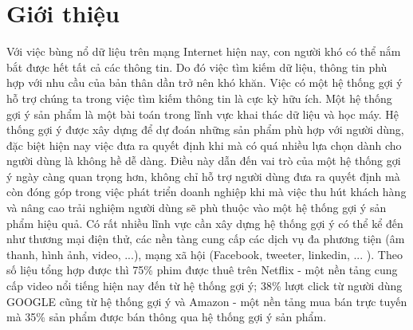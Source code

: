 \chapter{Giới thiệu}
\label{Chapter1}






Với việc bùng nổ dữ liệu trên mạng Internet hiện nay, con người khó có thể nắm bắt được hết tất cả các thông tin.
Do đó việc tìm kiếm dữ liệu, thông tin phù hợp với nhu cầu của bản thân dần trở nên khó khăn.
Việc có một hệ thống gợi ý hỗ trợ chúng ta trong việc tìm kiếm thông tin là cực kỳ hữu ích. 
Một hệ thống gợi ý sản phẩm là một bài toán trong lĩnh vực khai thác dữ liệu và học máy. 
Hệ thống gợi ý được xây dựng để dự đoán những sản phẩm phù hợp với người dùng, đặc biệt hiện nay việc đưa ra quyết định khi mà có quá nhiều lựa chọn dành cho người dùng là không hề dễ dàng. 
Điều này dẫn đến vai trò của một hệ thống gợi ý ngày càng quan trọng hơn, không chỉ hỗ trợ người dùng đưa ra quyết định mà còn đóng góp trong việc phát triển doanh nghiệp khi mà việc thu hút khách hàng và nâng cao trải nghiệm người dùng sẽ phù thuộc vào một hệ thống gợi ý sản phẩm hiệu quả. 
Có rất nhiều lĩnh vực cần xây dựng hệ thống gợi ý có thể kể đến như thương mại điện thử, các nền tàng cung cấp các dịch vụ đa phương tiện (âm thanh, hình ảnh, video, ...), mạng xã hội (Facebook, tweeter, linkedin, ... ).  
Theo số liệu tổng hợp được thì 75\% phim được thuê trên Netflix - một nền tảng cung cấp video nổi tiếng hiện nay đến từ hệ thống gợi ý; 38\% lượt click từ người dùng GOOGLE cũng từ hệ thống gợi ý và Amazon - một nền tảng mua bán trực tuyến mà 35\% sản phẩm được bán thông qua hệ thống gợi ý sản phẩm. 


